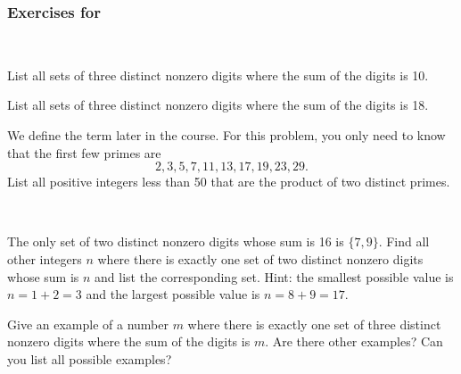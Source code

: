 
\subsubsection*{Exercises for  \subsetsdigits}

\begin{exer} [\exerP]%
\label{exer_3digit_sums}
    ~
    \begin{exerpart}
    \item  List all sets of three distinct nonzero digits where the sum of the digits is 10.
    \item List all sets of three distinct nonzero digits where the sum of the digits is 18. %
    \end{exerpart}
\end{exer}

\begin{exer} [\exerU]%
\label{exer_prime_products}
    We define the term  later in the course.  For this problem, you only need to know that the first few primes are 
        $$2, 3, 5, 7, 11, 13, 17, 19, 23, 29.$$
    List all positive integers less than 50 that are the product of two distinct primes.
\end{exer}

\begin{exer}[\exerU] %
\label{exer_kakuro23}
~
    \begin{exerpart}
        \item The only set of two distinct nonzero digits whose sum is 16 is $\{7,9\}$.  Find all other integers $n$ where there is exactly one set of two distinct nonzero digits whose sum is $n$ and list the corresponding set. Hint: the smallest possible value is $n=1+2 = 3$ and the largest possible value is $n =8+9=17$. 
        \item Give an example of a number $m$ where there is exactly one set of three distinct nonzero digits where the sum of the digits is $m$. Are there other examples? Can you list all possible examples?
    \end{exerpart}
\end{exer} 

